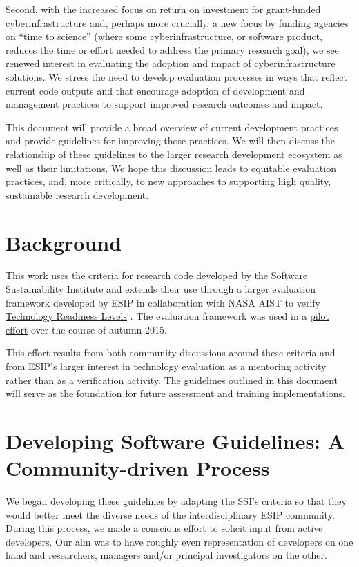 \documentclass{article}
\begin{document}
Second, with the increased focus on return on investment for grant-funded cyberinfrastructure and, perhaps more crucially, a new focus by funding agencies on “time to science” (where some cyberinfrastructure, or software product, reduces the time or effort needed to address the primary research goal), we see renewed interest in evaluating the adoption and impact of cyberinfrastructure solutions. We stress the need to develop evaluation processes in ways that reflect current code outputs and that encourage adoption of development and management practices to support improved research outcomes and impact.
 
This document will provide a broad overview of current development practices and provide guidelines for improving those practices. We will then discuss the relationship of these guidelines to the larger research development ecosystem as well as their limitations. We hope this discussion leads to equitable evaluation practices, and, more critically, to new approaches to supporting high quality, sustainable research development.

\section{Background}
This work uses the criteria for research code developed by the \href{http://software.ac.uk/sites/default/files/SSI-SoftwareEvaluationCriteria.pdf} {Software Sustainability Institute} \autocite{jackson_software_2011} and extends their use through a larger evaluation framework developed by ESIP in collaboration with NASA AIST to verify \href{https://www.nasa.gov/directorates/heo/scan/engineering/technology/txt_accordion1.html} {Technology Readiness Levels} \autocite{_nasa_2012}. The evaluation framework was used in a \href{http://testbed.esipfed.org/sites/default/files/2015_AIST_Evaluations_Overview.pdf} {pilot effort} \autocite{burgess_2015_2016,graybeal_esip_2016} over the course of autumn 2015. 
 
This effort results from both community discussions around these criteria and from ESIP’s larger interest in technology evaluation as a mentoring activity rather than as a verification activity. The guidelines outlined in this document will serve as the foundation for future assessment and training implementations.

\section{Developing Software Guidelines: A Community-driven Process}
We began developing these guidelines by adapting the SSI’s criteria so that they would better meet the diverse needs of the interdisciplinary ESIP community. During this process, we made a conscious effort to solicit input from active developers. Our aim was to have roughly even representation of developers on one hand and researchers, managers and/or principal investigators on the other. 
 
\end{document}
